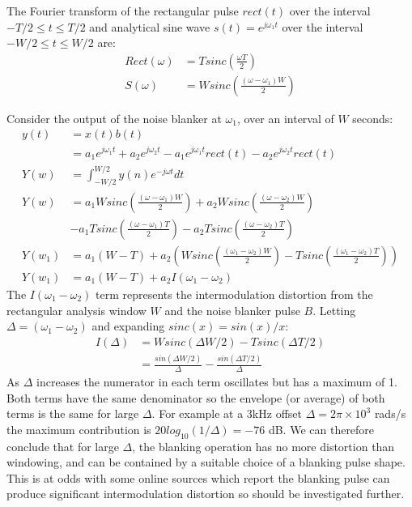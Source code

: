 \documentclass{article}
\begin{document}
The Fourier transform of the rectangular pulse $rect(t)$ over the interval $-T/2 \le t \le T/2$ and analytical sine wave $s(t)=e^{j \omega_1 t}$ over the interval $-W/2 \le t \le W/2$ are:
\begin{equation}
\begin{split}
Rect(\omega) &= T sinc \left( \frac{\omega T}{2} \right)	\\
S(\omega) &= W sinc \left( \frac{(\omega - \omega_1)W}{2} \right)
\end{split}
\end{equation} 


Consider the output of the noise blanker at $\omega_1$, over an interval of $W$ seconds:
\begin{equation}
\begin{split}
y(t) &= x(t)b(t) \\
     &= a_1 e^{j \omega_1 t} + a_2 e^{j \omega_2 t} - a_1 e^{j \omega_1 t}rect(t) - a_2 e^{j \omega_2 t}rect(t) \\
Y(w) &= \int_{-W/2}^{W/2} y(n) e^{-j \omega t} dt \\    
Y(w) &= a_1 W sinc \left( \frac{(\omega-\omega_1)W}{2} \right) + a_2 W sinc \left( \frac{(\omega-\omega_2)W}{2}  \right)\\
     &- a_1 T sinc \left( \frac{(\omega-\omega_1)T}{2} \right) - a_2 T sinc \left( \frac{(\omega-\omega_2)T}{2} \right) \\
Y(w_1) &= a_1(W-T) + a_2 \left( W sinc \left( \frac{(\omega_1-\omega_2)W}{2} \right) - T sinc \left( \frac{(\omega_1-\omega_2)T}{2} \right) \right) \\
Y(w_1) &= a_1(W-T) + a_2 I(\omega_1-\omega_2)
\end{split}
\end{equation} 
The $I(\omega_1-\omega_2)$ term represents the intermodulation distortion from the rectangular analysis window $W$ and the noise blanker pulse $B$.  Letting $\Delta = (\omega_1-\omega_2)$ and expanding $sinc(x) = sin(x)/x$:
\begin{equation}
\begin{split}
I(\Delta) &= W sinc (\Delta W/2) - T sinc (\Delta T/2) \\
&= \frac{sin (\Delta W/2)}{\Delta} - \frac{sin (\Delta T/2)}{\Delta}
\end{split}
\end{equation} 
As $\Delta$ increases the numerator in each term oscillates but has a maximum of 1.  Both terms have the same denominator so the envelope (or average) of both terms is the same for large $\Delta$.  For example at a 3kHz offset $\Delta = 2 \pi \times 10^3 $ rads/s the maximum contribution is $20log_{10}(1/\Delta) = -76$ dB. We can therefore conclude that for large $\Delta$, the blanking operation has no more distortion than windowing, and can be contained by a suitable choice of a blanking pulse shape. This is at odds with some online sources which report the blanking pulse can produce significant intermodulation distortion so should be investigated further.



\end{document}
